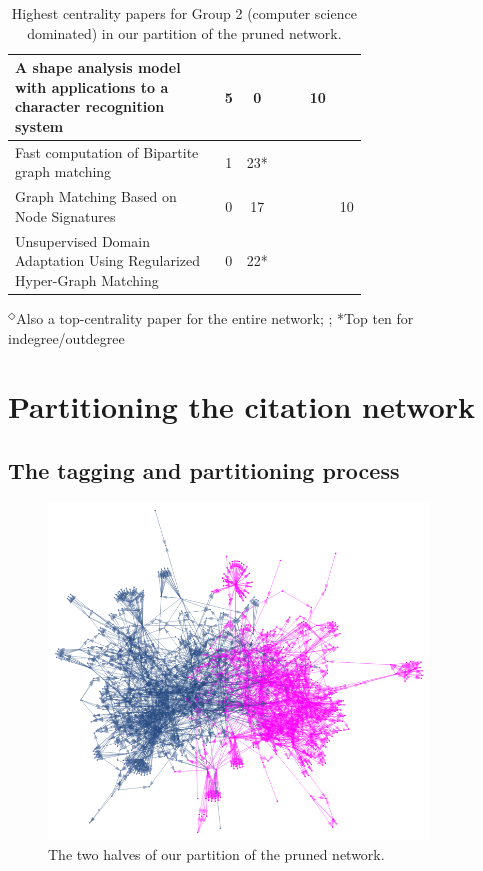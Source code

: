 \documentclass[12pt]{thesis}
\theoremstyle{plain}
\theoremstyle{definition}
\theoremstyle{remark}
\begin{document}
\begin{table}[H]
{\begin{tabular}{|L{0.7\linewidth}|c|c|c|c|c|c|}
A shape analysis model with applications to a character recognition system  \cite{Rocha_1994} & 5 & 0 &  &  & 10 &  \\ \hline
Fast computation of Bipartite graph matching  \cite{Serratosa_2014} & 1 & 23* &  &  &  &  \\ \hline
Graph Matching Based on Node Signatures  \cite{Jouili_2009} & 0 & 17 &  &  &  & 10 \\ \hline
Unsupervised Domain Adaptation Using Regularized Hyper-Graph Matching  \cite{Das_2018} & 0 & 22* &  &  &  &  \\ \hline
\end{tabular}
$^\Diamond$Also a top-centrality paper for the entire network; ; *Top ten for indegree/outdegree}
\caption{Highest centrality papers for Group 2 (computer science dominated) in our partition of the pruned network.}
\label{tab:toppapers_CS}
\end{table}

















\chapter{Partitioning the citation network}\label{chapter:partitioning}

\section{The tagging and partitioning process}

\begin{figure}[h]
\centering
\includegraphics[width=0.9\textwidth]{subnetwork_partition.png}
\caption{The two halves of our partition of the pruned network.}
\label{fig:partitioned_network}
\end{figure}
\end{document}
